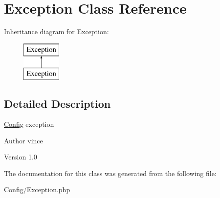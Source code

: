 \hypertarget{class_anemo_1_1_config_1_1_exception}{
\section{Exception Class Reference}
\label{class_anemo_1_1_config_1_1_exception}
}
Inheritance diagram for Exception:\begin{figure}[H]
\begin{center}
\leavevmode
\includegraphics[height=2.000000cm]{class_anemo_1_1_config_1_1_exception}
\end{center}
\end{figure}


\subsection{Detailed Description}
\hyperlink{class_anemo_1_1_config}{Config} exception \begin{DoxyAuthor}{Author}
vince 
\end{DoxyAuthor}
\begin{DoxyVersion}{Version}
1.0 
\end{DoxyVersion}


The documentation for this class was generated from the following file:\begin{DoxyCompactItemize}
\item 
Config/Exception.php\end{DoxyCompactItemize}
